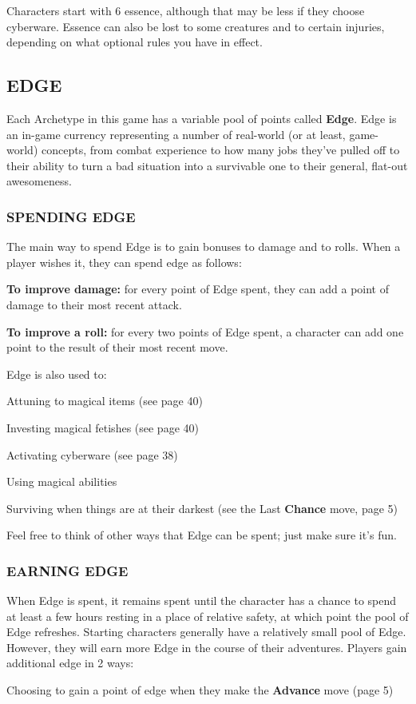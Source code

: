 \documentclass[oneside,10pt]{article}
\begin{document}
\begin{multicols}{2}
Characters start with 6 essence, although that may be less
if they choose cyberware. Essence can also be lost to some
creatures and to certain injuries, depending on what optional
rules you have in effect.

\subsection{EDGE}

Each Archetype in this game has a variable pool of points
called \textbf{Edge}. Edge is an in-game currency representing a
number of real-world (or at least, game-world) concepts,
from combat experience to how many jobs they’ve pulled off
 to their ability to turn a bad situation into a survivable one to
their general, flat-out awesomeness.

\subsubsection{SPENDING EDGE}
The main way to spend Edge is to gain bonuses to damage
and to rolls. When a player wishes it, they can spend edge
as follows:

\begin{adjustwidth*}{.5cm}{.5cm}
\textbf{To improve damage:} for every point of Edge spent, they
can add a point of damage to their most recent
attack.

\textbf{To improve a roll:} for every two points of Edge spent,
a character can add one point to the result of their most
recent move.
\end{adjustwidth*}

Edge is also used to:

\begin{adjustwidth*}{.5cm}{.5cm}
\tcirc{} Attuning to magical items (see page 40)

\tcirc{} Investing magical fetishes (see page 40)

\tcirc{} Activating cyberware (see page 38)

\tcirc{} Using magical abilities

\tcirc{} Surviving when things are at their darkest (see the Last
\textbf{Chance} move, page 5)
\end{adjustwidth*}

Feel free to think of other ways that Edge can be spent; just
make sure it’s fun.

\subsubsection{EARNING EDGE}
When Edge is spent, it remains spent until the character has
a chance to spend at least a few hours resting in a place
of relative safety, at which point the pool of Edge refreshes.
Starting characters generally have a relatively small pool of
Edge. However, they will earn more Edge in the course of
their adventures. Players gain additional edge in
2 ways:
\begin{adjustwidth*}{.5cm}{.5cm}
\tcirc{} Choosing to gain a point of edge when they make the
\textbf{Advance} move (page 5)


\end{adjustwidth*}
\end{multicols}
\end{document}
